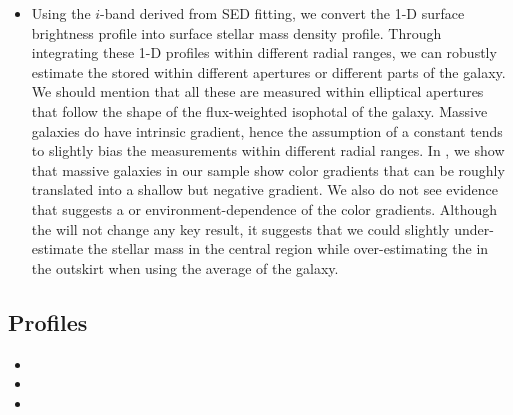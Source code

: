 \documentclass[a4paper,fleqn,usenatbib]{mnras}
\begin{document}
\begin{itemize}
		\item Using the $i$-band \mlratio{} derived from SED fitting, we convert the
			1-D surface brightness profile into surface stellar mass density profile.
            Through integrating these 1-D profiles within different radial ranges, we
            can robustly estimate the \mstar{} stored within different apertures or
            different parts of the galaxy.
            We should mention that all these \mstar{} are measured within elliptical
            apertures that follow the shape of the flux-weighted isophotal of the galaxy.
            Massive galaxies do have intrinsic \mlratio{} gradient, hence the assumption of
            a constant \mlratio{} tends to slightly bias the \mstar{} measurements within
            different radial ranges.
            In \citet{Huang2018b}, we show that massive galaxies in our sample show
            color gradients that can be roughly translated into a shallow but negative
            \mlratio{} gradient.
            We also do not see evidence that suggests a \mstar{} or environment-dependence
            of the color gradients.
            Although the \mlratio{} will not change any key result, it suggests that we
            could slightly under-estimate the stellar mass in the central region while
            over-estimating the \mstar{} in the outskirt when using the average \mlratio{}
            of the galaxy.

	\end{itemize}


\subsection{\dsigma{} Profiles}
    \label{sec:dsigma}


    \begin{itemize}

        \item {}

		\item {}

		\item {}

	\end{itemize}
\end{document}
